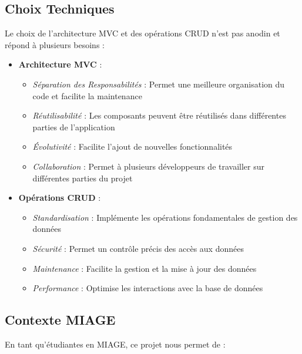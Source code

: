 \documentclass[12pt,a4paper]{article}
\begin{document}
\subsection{Choix Techniques}
Le choix de l'architecture MVC et des opérations CRUD n'est pas anodin et répond à plusieurs besoins :

\begin{itemize}
    \item \textbf{Architecture MVC} :
    \begin{itemize}
        \item \textit{Séparation des Responsabilités} : Permet une meilleure organisation du code et facilite la maintenance
        \item \textit{Réutilisabilité} : Les composants peuvent être réutilisés dans différentes parties de l'application
        \item \textit{Évolutivité} : Facilite l'ajout de nouvelles fonctionnalités
        \item \textit{Collaboration} : Permet à plusieurs développeurs de travailler sur différentes parties du projet
    \end{itemize}

    \item \textbf{Opérations CRUD} :
    \begin{itemize}
        \item \textit{Standardisation} : Implémente les opérations fondamentales de gestion des données
        \item \textit{Sécurité} : Permet un contrôle précis des accès aux données
        \item \textit{Maintenance} : Facilite la gestion et la mise à jour des données
        \item \textit{Performance} : Optimise les interactions avec la base de données
    \end{itemize}
\end{itemize}

\subsection{Contexte MIAGE}
En tant qu'étudiantes en MIAGE, ce projet nous permet de :
\end{document}
